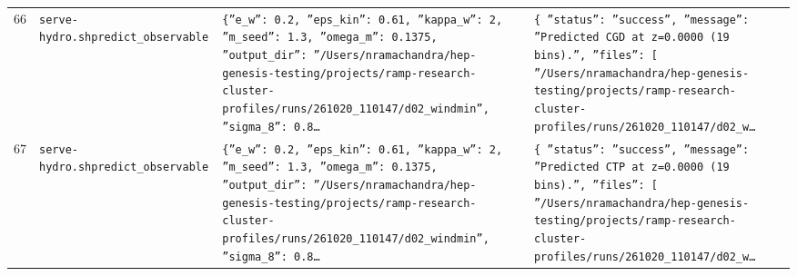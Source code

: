 \documentclass[11pt,a4paper]{article}
\begin{document}
\begin{longtable}{@{}p{}p{}p{}p{}@{}}
66 & \texttt{serve-hydro.sh}\newline\texttt{predict\_\allowbreak{}observable} & \texttt{\{''e\_\allowbreak{}w'':\allowbreak{} 0.2,\allowbreak{} ''eps\_\allowbreak{}kin'':\allowbreak{} 0.61,\allowbreak{} ''kappa\_\allowbreak{}w'':\allowbreak{} 2,\allowbreak{} ''m\_\allowbreak{}seed'':\allowbreak{} 1.3,\allowbreak{} ''omega\_\allowbreak{}m'':\allowbreak{} 0.1375,\allowbreak{} ''output\_\allowbreak{}dir'':\allowbreak{} ''/\allowbreak{}Users/\allowbreak{}nramachandra/\allowbreak{}hep-genesis-testing/\allowbreak{}projects/\allowbreak{}ramp-research-cluster-profiles/\allowbreak{}runs/\allowbreak{}261020\_\allowbreak{}110147/\allowbreak{}d02\_\allowbreak{}windmin'',\allowbreak{} ''sigma\_\allowbreak{}8'':\allowbreak{} 0.8\ldots{}\allowbreak{}} & \texttt{\{   ''status'':\allowbreak{} ''success'',\allowbreak{}   ''message'':\allowbreak{} ''Predicted CGD at z=\allowbreak{}0.0000 (19 bins)\allowbreak{}.'',\allowbreak{}   ''files'':\allowbreak{} [     ''/\allowbreak{}Users/\allowbreak{}nramachandra/\allowbreak{}hep-genesis-testing/\allowbreak{}projects/\allowbreak{}ramp-research-cluster-profiles/\allowbreak{}runs/\allowbreak{}261020\_\allowbreak{}110147/\allowbreak{}d02\_\allowbreak{}w\ldots{}\allowbreak{}} \\
67 & \texttt{serve-hydro.sh}\newline\texttt{predict\_\allowbreak{}observable} & \texttt{\{''e\_\allowbreak{}w'':\allowbreak{} 0.2,\allowbreak{} ''eps\_\allowbreak{}kin'':\allowbreak{} 0.61,\allowbreak{} ''kappa\_\allowbreak{}w'':\allowbreak{} 2,\allowbreak{} ''m\_\allowbreak{}seed'':\allowbreak{} 1.3,\allowbreak{} ''omega\_\allowbreak{}m'':\allowbreak{} 0.1375,\allowbreak{} ''output\_\allowbreak{}dir'':\allowbreak{} ''/\allowbreak{}Users/\allowbreak{}nramachandra/\allowbreak{}hep-genesis-testing/\allowbreak{}projects/\allowbreak{}ramp-research-cluster-profiles/\allowbreak{}runs/\allowbreak{}261020\_\allowbreak{}110147/\allowbreak{}d02\_\allowbreak{}windmin'',\allowbreak{} ''sigma\_\allowbreak{}8'':\allowbreak{} 0.8\ldots{}\allowbreak{}} & \texttt{\{   ''status'':\allowbreak{} ''success'',\allowbreak{}   ''message'':\allowbreak{} ''Predicted CTP at z=\allowbreak{}0.0000 (19 bins)\allowbreak{}.'',\allowbreak{}   ''files'':\allowbreak{} [     ''/\allowbreak{}Users/\allowbreak{}nramachandra/\allowbreak{}hep-genesis-testing/\allowbreak{}projects/\allowbreak{}ramp-research-cluster-profiles/\allowbreak{}runs/\allowbreak{}261020\_\allowbreak{}110147/\allowbreak{}d02\_\allowbreak{}w\ldots{}\allowbreak{}} \\

\end{longtable}
\end{document}
